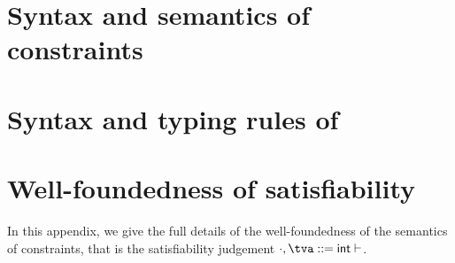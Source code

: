 \documentclass[acmsmall,screen,nonacm]{acmart}
\begin{document}





\appendix

\section{Syntax and semantics of constraints}

\section{Syntax and typing rules of \OML}

\section{Well-foundedness of satisfiability}
\label{appendix:wf}

In this appendix, we give the full details of the well-foundedness of the
semantics of constraints, that is the satisfiability judgement $\semenv \th \c$.
\end{document}

